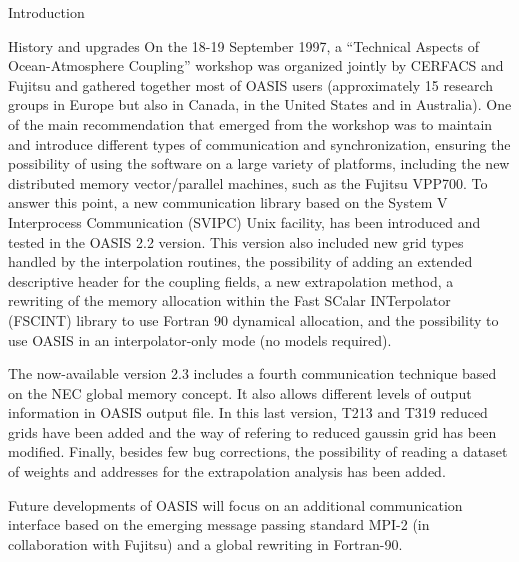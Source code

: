 \begin{section}{Introduction}
\begin{subsection}{History and upgrades}
On the 18-19 September 1997, a ``Technical Aspects of Ocean-Atmosphere
Coupling'' workshop was organized jointly by CERFACS and
Fujitsu and gathered together most of OASIS users (approximately
15 research groups in Europe but also in Canada, in the United States 
and in Australia). One of the main recommendation that emerged from the
workshop was to maintain and introduce different
types of communication and synchronization, ensuring the possibility of
using the software on a large variety of platforms, including the new 
distributed memory vector/parallel machines, such as the Fujitsu VPP700.
To answer this point, a new communication library based on the System
V Interprocess Communication
(SVIPC) Unix facility, has been introduced and tested in the 
OASIS 2.2 version. This version also included new grid types 
handled by the interpolation routines, the possibility of adding an
extended descriptive header for the coupling fields, a new extrapolation
method, a rewriting of the memory allocation within the Fast SCalar 
INTerpolator (FSCINT) library to use Fortran 90 dynamical allocation, and the 
possibility to use OASIS in an interpolator-only mode (no models
required). 

\vspace{0.4cm}

The now-available version 2.3 includes a fourth communication technique
based on the NEC global memory concept. It also allows different levels of
output information in OASIS output file. In this last version, T213 and T319
reduced grids have been added and the way of refering to reduced gaussin grid 
has been modified. Finally, besides few bug corrections, the possibility of
reading a dataset of weights and addresses for the extrapolation analysis
has been added.

\vspace{0.4cm} 

Future developments of OASIS will focus on an additional 
communication interface based on the emerging
message passing standard MPI-2 (in collaboration with Fujitsu) and a global 
rewriting in Fortran-90.

\vspace{0.4cm}


\end{subsection}
\end{section}
